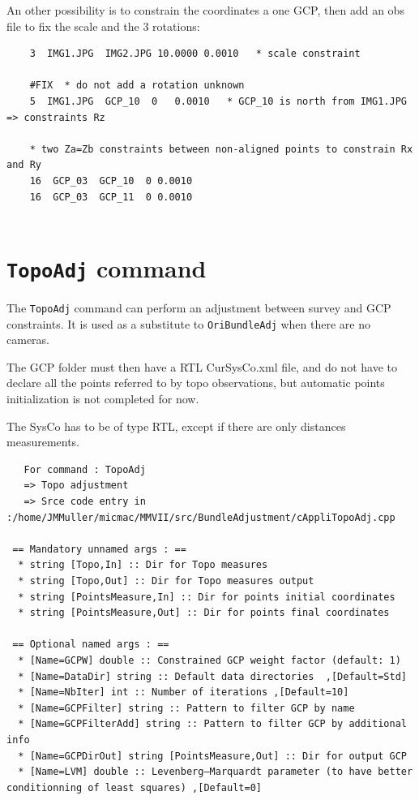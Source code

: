 An other possibility is to constrain the coordinates a one GCP, then add an obs file to fix the scale and the 3 rotations:
\begin{verbatim}
    3  IMG1.JPG  IMG2.JPG 10.0000 0.0010   * scale constraint

    #FIX  * do not add a rotation unknown
    5  IMG1.JPG  GCP_10  0   0.0010   * GCP_10 is north from IMG1.JPG => constraints Rz

    * two Za=Zb constraints between non-aligned points to constrain Rx and Ry
    16  GCP_03  GCP_10  0 0.0010
    16  GCP_03  GCP_11  0 0.0010
    
\end{verbatim}


\section{{\tt TopoAdj} command}

The {\tt TopoAdj} command can perform an adjustment between survey and GCP constraints.
It is used as a substitute to {\tt OriBundleAdj} when there are no cameras.

The GCP folder must then have a RTL CurSysCo.xml file, and do not have to declare all the points
referred to by topo observations, but automatic points initialization is not completed for now.

The SysCo has to be of type RTL, except if there are only distances measurements.

\begin{verbatim}
   For command : TopoAdj 
   => Topo adjustment
   => Srce code entry in :/home/JMMuller/micmac/MMVII/src/BundleAdjustment/cAppliTopoAdj.cpp

 == Mandatory unnamed args : ==
  * string [Topo,In] :: Dir for Topo measures
  * string [Topo,Out] :: Dir for Topo measures output
  * string [PointsMeasure,In] :: Dir for points initial coordinates
  * string [PointsMeasure,Out] :: Dir for points final coordinates

 == Optional named args : ==
  * [Name=GCPW] double :: Constrained GCP weight factor (default: 1)
  * [Name=DataDir] string :: Default data directories  ,[Default=Std]
  * [Name=NbIter] int :: Number of iterations ,[Default=10]
  * [Name=GCPFilter] string :: Pattern to filter GCP by name
  * [Name=GCPFilterAdd] string :: Pattern to filter GCP by additional info
  * [Name=GCPDirOut] string [PointsMeasure,Out] :: Dir for output GCP
  * [Name=LVM] double :: Levenberg–Marquardt parameter (to have better conditionning of least squares) ,[Default=0]

\end{verbatim}



